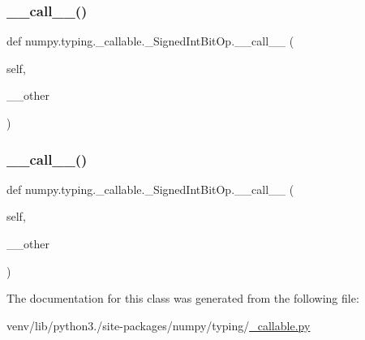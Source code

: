 \subsubsection{\texorpdfstring{\+\_\+\+\_\+call\+\_\+\+\_\+()}{\_\_call\_\_()}\hspace{0.1cm}{\footnotesize\ttfamily [2/3]}}
{\footnotesize\ttfamily def numpy.\+typing.\+\_\+callable.\+\_\+\+Signed\+Int\+Bit\+Op.\+\_\+\+\_\+call\+\_\+\+\_\+ (\begin{DoxyParamCaption}\item[{}]{self,  }\item[{}]{\+\_\+\+\_\+other }\end{DoxyParamCaption})}

\mbox{\label{classnumpy_1_1typing_1_1__callable_1_1__SignedIntBitOp_a74dfd37694e91ece5bebcc213cfc6c91}} 
\subsubsection{\texorpdfstring{\+\_\+\+\_\+call\+\_\+\+\_\+()}{\_\_call\_\_()}\hspace{0.1cm}{\footnotesize\ttfamily [3/3]}}
{\footnotesize\ttfamily def numpy.\+typing.\+\_\+callable.\+\_\+\+Signed\+Int\+Bit\+Op.\+\_\+\+\_\+call\+\_\+\+\_\+ (\begin{DoxyParamCaption}\item[{}]{self,  }\item[{}]{\+\_\+\+\_\+other }\end{DoxyParamCaption})}



The documentation for this class was generated from the following file\+:\begin{DoxyCompactItemize}
\item 
venv/lib/python3./site-\/packages/numpy/typing/\hyperlink{__callable_8py}{\+\_\+callable.\+py}\end{DoxyCompactItemize}
